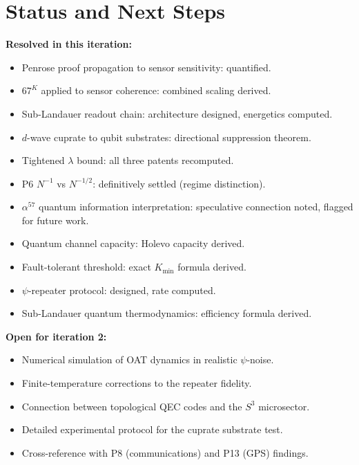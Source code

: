 \documentclass[11pt]{article}
\theoremstyle{definition}
\theoremstyle{remark}
\begin{document}
\section*{Status and Next Steps}

\textbf{Resolved in this iteration:}
\begin{itemize}
\item Penrose proof propagation to sensor sensitivity: quantified.
\item $67^K$ applied to sensor coherence: combined scaling derived.
\item Sub-Landauer readout chain: architecture designed, energetics computed.
\item $d$-wave cuprate to qubit substrates: directional suppression theorem.
\item Tightened $\lambda$ bound: all three patents recomputed.
\item P6 $N^{-1}$ vs $N^{-1/2}$: definitively settled (regime distinction).
\item $\alpha^{57}$ quantum information interpretation: speculative connection noted, flagged for future work.
\item Quantum channel capacity: Holevo capacity derived.
\item Fault-tolerant threshold: exact $K_{\min}$ formula derived.
\item $\psi$-repeater protocol: designed, rate computed.
\item Sub-Landauer quantum thermodynamics: efficiency formula derived.
\end{itemize}

\textbf{Open for iteration 2:}
\begin{itemize}
\item Numerical simulation of OAT dynamics in realistic $\psi$-noise.
\item Finite-temperature corrections to the repeater fidelity.
\item Connection between topological QEC codes and the $S^3$ microsector.
\item Detailed experimental protocol for the cuprate substrate test.
\item Cross-reference with P8 (communications) and P13 (GPS) findings.
\end{itemize}
\end{document}
